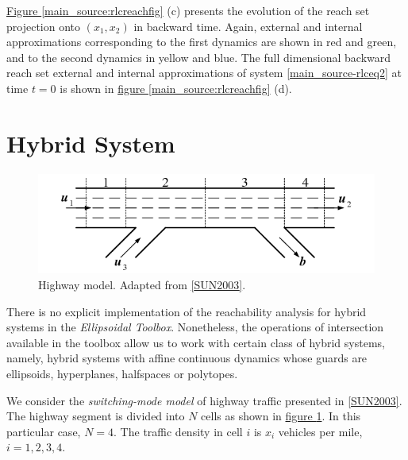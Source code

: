 \documentclass[letterpaper,10pt,english]{sphinxmanual}
\begin{document}
\hyperref[main_source:rlcreachfig]{Figure  \ref*{main_source:rlcreachfig}} (c) presents the evolution of the reach set projection onto
$(x_1, x_2)$ in backward time. Again, external and internal
approximations corresponding to the first dynamics are shown in red and
green, and to the second dynamics in yellow and blue. The full
dimensional backward reach set external and internal approximations of
system \eqref{main_source-rlceq2} at time $t=0$ is shown in \hyperref[main_source:rlcreachfig]{figure  \ref*{main_source:rlcreachfig}} (d).


\section{Hybrid System}
\label{main_source:hybrid-system}\begin{figure}[htbp]
\centering
\capstart

\includegraphics{hw.png}
\caption{Highway model. Adapted from {\hyperref[main_source:sun2003]{{[}SUN2003{]}}}.}\label{main_source:hwfig}\end{figure}

There is no explicit implementation of the reachability analysis for
hybrid systems in the \emph{Ellipsoidal Toolbox}. Nonetheless, the operations
of intersection available in the toolbox allow us to work with certain
class of hybrid systems, namely, hybrid systems with affine continuous
dynamics whose guards are ellipsoids, hyperplanes, halfspaces or
polytopes.

We consider the \emph{switching-mode model} of highway traffic presented in
{\hyperref[main_source:sun2003]{{[}SUN2003{]}}}. The highway segment is divided into $N$
cells as shown in \hyperref[main_source:hwfig]{figure  \ref*{main_source:hwfig}}. In this particular case, $N=4$.
The traffic density in cell $i$ is $x_i$ vehicles per mile,
$i=1,2,3,4$.
\end{document}
